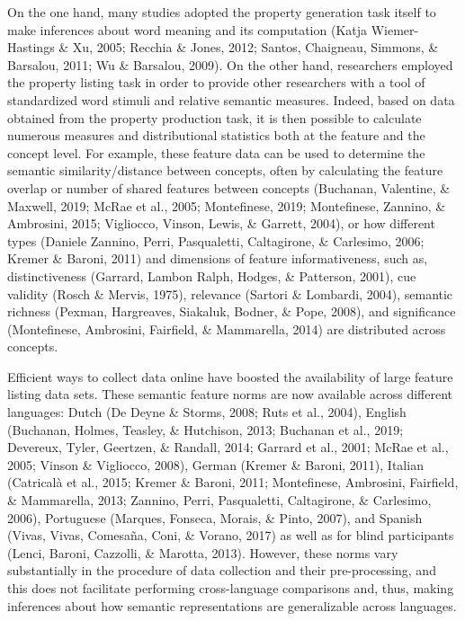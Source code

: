 \documentclass[man]{apa6}
\begin{document}
On the one hand, many studies adopted the property generation task itself to make inferences about word meaning and its computation (Katja Wiemer-Hastings \& Xu, 2005; Recchia \& Jones, 2012; Santos, Chaigneau, Simmons, \& Barsalou, 2011; Wu \& Barsalou, 2009). On the other hand, researchers employed the property listing task in order to provide other researchers with a tool of standardized word stimuli and relative semantic measures. Indeed, based on data obtained from the property production task, it is then possible to calculate numerous measures and distributional statistics both at the feature and the concept level. For example, these feature data can be used to determine the semantic similarity/distance between concepts, often by calculating the feature overlap or number of shared features between concepts (Buchanan, Valentine, \& Maxwell, 2019; McRae et al., 2005; Montefinese, 2019; Montefinese, Zannino, \& Ambrosini, 2015; Vigliocco, Vinson, Lewis, \& Garrett, 2004), or how different types (Daniele Zannino, Perri, Pasqualetti, Caltagirone, \& Carlesimo, 2006; Kremer \& Baroni, 2011) and dimensions of feature informativeness, such as, distinctiveness (Garrard, Lambon Ralph, Hodges, \& Patterson, 2001), cue validity (Rosch \& Mervis, 1975), relevance (Sartori \& Lombardi, 2004), semantic richness (Pexman, Hargreaves, Siakaluk, Bodner, \& Pope, 2008), and significance (Montefinese, Ambrosini, Fairfield, \& Mammarella, 2014) are distributed across concepts.

Efficient ways to collect data online have boosted the availability of large feature listing data sets. These semantic feature norms are now available across different languages: Dutch (De Deyne \& Storms, 2008; Ruts et al., 2004), English (Buchanan, Holmes, Teasley, \& Hutchison, 2013; Buchanan et al., 2019; Devereux, Tyler, Geertzen, \& Randall, 2014; Garrard et al., 2001; McRae et al., 2005; Vinson \& Vigliocco, 2008), German (Kremer \& Baroni, 2011), Italian (Catricalà et al., 2015; Kremer \& Baroni, 2011; Montefinese, Ambrosini, Fairfield, \& Mammarella, 2013; Zannino, Perri, Pasqualetti, Caltagirone, \& Carlesimo, 2006), Portuguese (Marques, Fonseca, Morais, \& Pinto, 2007), and Spanish (Vivas, Vivas, Comesaña, Coni, \& Vorano, 2017) as well as for blind participants (Lenci, Baroni, Cazzolli, \& Marotta, 2013). However, these norms vary substantially in the procedure of data collection and their pre-processing, and this does not facilitate performing cross-language comparisons and, thus, making inferences about how semantic representations are generalizable across languages.
\end{document}
